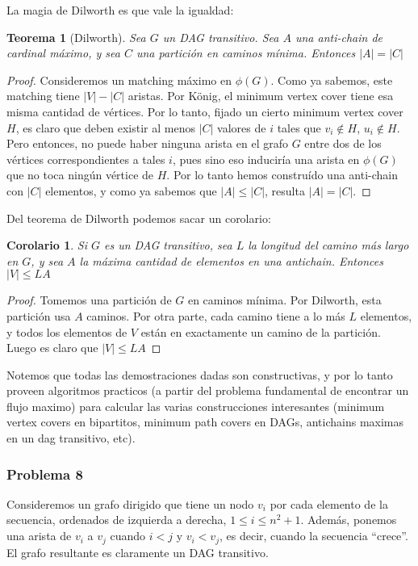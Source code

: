 \documentclass{article}
\newtheorem{teorema}{{\sc Teorema}}
\newtheorem{corolario}{{\sc Corolario}}
\begin{document}
La magia de Dilworth es que vale la igualdad:

\begin{teorema}[Dilworth]
Sea $G$ un DAG transitivo. Sea $A$ una anti-chain de cardinal máximo, y sea $C$ una partición en caminos mínima. Entonces $|A| = |C|$
\end{teorema}
\begin{proof}
Consideremos un matching máximo en $\phi(G)$. Como ya sabemos, este matching tiene $|V| - |C|$ aristas. Por König, el minimum vertex cover
tiene esa misma cantidad de vértices. Por lo tanto, fijado un cierto minimum vertex cover $H$, es claro que deben existir al menos 
$|C|$ valores de $i$ tales que $v_i \notin H$, $u_i \notin H$. Pero entonces, no puede haber ninguna arista en el grafo $G$ entre dos
de los vértices correspondientes a tales $i$, pues sino eso induciría una arista en $\phi(G)$ que no toca ningún vértice de $H$. Por
lo tanto hemos construído una anti-chain con $|C|$ elementos, y como ya sabemos que $|A| \leq |C|$, resulta $|A| = |C|$.
\end{proof}

Del teorema de Dilworth podemos sacar un corolario:

\begin{corolario}
Si $G$ es un DAG transitivo, sea $L$ la longitud del camino más largo en $G$, y sea $A$ la máxima cantidad de elementos en una antichain.
Entonces $|V| \leq L A$
\end{corolario}
\begin{proof}
Tomemos una partición de $G$ en caminos mínima. Por Dilworth, esta partición usa $A$ caminos. Por otra parte, cada camino tiene a lo más $L$
elementos, y todos los elementos de $V$ están en exactamente un camino de la partición. Luego es claro que $|V| \leq L A$
\end{proof}

Notemos que todas las demostraciones dadas son constructivas, y por lo tanto proveen algoritmos practicos (a partir del problema fundamental de
encontrar un flujo maximo) para calcular las varias construcciones interesantes (minimum vertex covers en bipartitos, minimum path covers
en DAGs, antichains maximas en un dag transitivo, etc).

\subsubsection{Problema 8}

Consideremos un grafo dirigido que tiene un nodo $v_i$ por cada elemento de la secuencia, ordenados de izquierda a derecha, $1 \leq i \leq n^2+1$.
Además, ponemos una arista de $v_i$ a $v_j$ cuando $i < j$ y $v_i < v_j$, es decir, cuando la secuencia ``crece''. El grafo resultante es
claramente un DAG transitivo.
\end{document}
